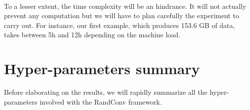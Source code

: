 \documentclass[a4paper]{report}
\begin{document}
		\paragraph{}
		To a lesser extent, the time complexity will be an hindrance. It will not actually prevent any computation but we will have to plan carefully the experiment to carry out. For instance, our first example, which produces 153.6 GB of data, takes between 5h and 12h depending on the machine load.
		
	\section{Hyper-parameters summary}
	Before elaborating on the results, we will rapidly summarize all the hyper-parameters involved with the RandConv framework.
	
\end{document}
